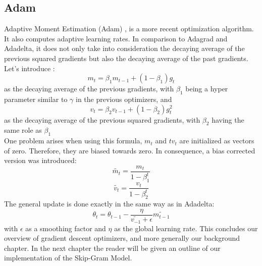 \subsection{Adam}
Adaptive Moment Estimation (Adam) \cite{adam}, is a more recent optimization algorithm. It also computes adaptive learning rates. In comparison to Adagrad and Adadelta, it does not only take into consideration the decaying average of the previous squared gradients but also the decaying average of the past gradients.
Let's introduce :
\begin{equation}
m_t = \beta_1 m_{t-1} + (1- \beta_1) g_t
\end{equation}
as the decaying average of the previous gradients, with $\beta_1$ being a hyper parameter similar to $\gamma$ in the previous optimizers, and
\begin{equation}
v_t = \beta_2 v_{t-1} + (1- \beta_2) g^2_t
\end{equation}
as the decaying average of the previous squared gradients, with $\beta_2$ having the same role as $\beta_1$ \\
One problem arises when using this formula, $m_t$ and $tv_t$ are initialized as vectors of zero. Therefore, they are biased towards zero. In consequence, a bias corrected version was introduced:\\
\begin{equation}
\tilde{m_t} = \frac{m_t}{1-\beta^t_1}
\end{equation}
\begin{equation}
\tilde{v_t} = \frac{v_t}{1-\beta^t_2}
\end{equation}
The general update is done exactly in the same way as in Adadelta:
\begin{equation}
\theta_{t} = \theta_{t-1} - \frac{\eta}{\tilde{v_{-1}}+ \epsilon} \tilde{m_{t-1}}
\end{equation}
with $\epsilon$ as a smoothing factor and $\eta$ as the global learning rate. This concludes our overview of gradient descent optimizers, and more generally our background chapter. In the next chapter the reader will be given an outline of our implementation of the Skip-Gram Model.